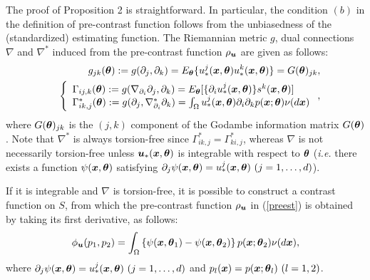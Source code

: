 \documentclass[graybox]{svmult}
\newcommand{\bm}[1]{\mbox{\boldmath $#1$}}
\newcommand{\bms}[1]{\mbox{\scriptsize\boldmath $#1$}}
\begin{document}
The proof of Proposition 2 is straightforward. In particular, the condition $(b)$ in the
definition of pre-contrast function follows from the unbiasedness of the (standardized)
estimating function.
The Riemannian metric $g$, dual connections $\nabla$ and $\nabla^{\ast}$ induced from
the pre-contrast function $\rho_{\bms{u}}$ are given as follows:
%
\begin{eqnarray*}
   &&g_{jk}(\bm{\theta}) := g(\partial_j,\partial_k)
                          = E_{\bms{\theta}}\{u_{\ast}^j(\bm{x},\bm{\theta})
                            u_{\ast}^k(\bm{x},\bm{\theta})\}
                          = G(\bm{\theta})_{jk}, 
                          \label{Godambe} \\
   &&\left\{\begin{array}{l}
             \Gamma_{ij,k}(\bm{\theta}) := g(\nabla_{\partial_i}\partial_j,\partial_k)
             = E_{\bms{\theta}}[\{\partial_iu_{\ast}^j(\bm{x},\bm{\theta})\}s^k(\bm{x},\bm{\theta})] \\
             \Gamma^{\ast}_{ik,j}(\bm{\theta}) 
             := g(\partial_j,\nabla^{\ast}_{\partial_i}\partial_k)
              = \int_{\Omega}u_{\ast}^j(\bm{x},\bm{\theta})\partial_i\partial_kp(\bm{x};\bm{\theta})
                \nu(d\bm{x})
            \end{array}
     \right., \label{dualconn}
\end{eqnarray*}
%
where $G(\bm{\theta})_{jk}$ is the $(j,k)$ component of the Godambe information matrix 
$G(\bm{\theta})$. Note that $\nabla^{\ast}$ is always torsion-free since 
$\Gamma^{\ast}_{ik,j}=\Gamma^{\ast}_{ki,j}$, whereas $\nabla$ is not necessarily 
torsion-free unless $\bm{u}_{\ast}(\bm{x},\bm{\theta})$ is integrable with respect to
$\bm{\theta}$ ({\it i.e.} there exists a function $\psi(\bm{x},\bm{\theta})$ satisfying
$\partial_j\psi(\bm{x},\bm{\theta})=u_{\ast}^j(\bm{x},\bm{\theta}) \ (j=1,\ldots,d)$).

If it is integrable and $\nabla$ is torsion-free, it is possible to construct a contrast
function on $S$, from which the pre-contrast function $\rho_{\bms{u}}$ in (\ref{preest})
is obtained by taking its first derivative, as follows:
%
\begin{eqnarray*}
   \phi_{\bms{u}}(p_1,p_2) = \int_{\Omega}\left\{\psi(\bm{x},\bm{\theta}_1) - \psi(\bm{x},\bm{\theta}_2)
                             \right\}p(\bm{x};\bm{\theta}_2)\nu(d\bm{x}),
\end{eqnarray*}
%
where $\partial_j\psi(\bm{x},\bm{\theta})=u_{\ast}^j(\bm{x},\bm{\theta}) \ (j=1,\ldots,d)$
and $p_l(\bm{x})=p(\bm{x};\bm{\theta}_l) \ (l=1,2)$.
\end{document}
